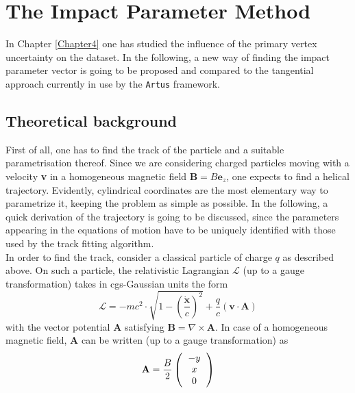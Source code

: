 \chapter{The Impact Parameter Method} %

\label{Chapter5} %

In Chapter \ref{Chapter4} one has studied the influence of the primary vertex uncertainty on the dataset. In the following, a new way of finding the impact parameter vector is going to be proposed and compared to the tangential approach \parencite{Claudia_thesis} currently in use by the \verb|Artus| framework.

\section{Theoretical background}
First of all, one has to find the track of the particle and a suitable parametrisation thereof. Since we are considering charged particles moving with a velocity \textbf{v} in a homogeneous magnetic field $\boldsymbol{B} = B\boldsymbol{e}_z$, one expects to find a helical trajectory. Evidently, cylindrical coordinates are the most elementary way to parametrize it, keeping the problem as simple as possible. In the following, a quick derivation of the trajectory is going to be discussed, since the parameters appearing in the equations of motion have to be uniquely identified with those used by the track fitting algorithm.\\
In order to find the track, consider a classical particle of charge $q$ as described above. On such a particle, the relativistic Lagrangian $\mathcal{L}$ (up to a gauge transformation) takes in cgs-Gaussian units the form \parencite{Jackson}
\begin{equation}
	\mathcal{L} = -mc^2\cdot\sqrt{1-\left(\frac{\dot{\boldsymbol{x}}}{c}\right)^2}+\frac{q}{c}( \boldsymbol{v}\cdot\mathbf{A})
\end{equation}
with the vector potential $\boldsymbol{A}$ satisfying $\boldsymbol{B} = \nabla \times \mathbf{A}$. In case of a homogeneous magnetic field, $\boldsymbol{A}$ can be written (up to a gauge transformation) as
\begin{equation}
	\mathbf{A} = \frac{B}{2}\left(\begin{tabular}{c}
	$-y $\\ 
	$x$\\ 
	$0$
	\end{tabular} \right)
\end{equation}
